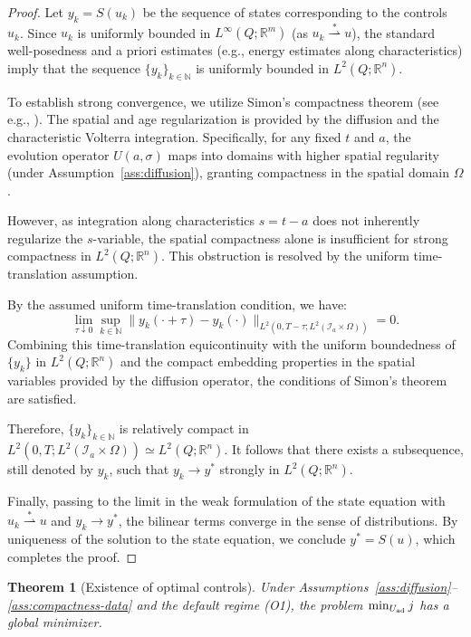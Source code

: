\documentclass[pdflatex,sn-mathphys-num]{sn-jnl}
\theoremstyle{plain}
\newtheorem{theorem}{Theorem}[section]
\theoremstyle{definition}
\theoremstyle{remark}
\newcommand{\R}{\mathbb R}
\newcommand{\N}{\mathbb N}
\begin{document}
\begin{proof}
Let \(y_k = S(u_k)\) be the sequence of states corresponding to the controls \(u_k\). Since \(u_k\) is uniformly bounded in \(L^\infty(Q;\R^m)\) (as \(u_k \overset{*}{\rightharpoonup} u\)), the standard well-posedness and a priori estimates (e.g., energy estimates along characteristics) imply that the sequence \(\{y_k\}_{k\in\N}\) is uniformly bounded in \(L^2(Q;\R^n)\).

To establish strong convergence, we utilize Simon's compactness theorem (see e.g., \cite{simon1986compact}). The spatial and age regularization is provided by the diffusion and the characteristic Volterra integration. Specifically, for any fixed \(t\) and \(a\), the evolution operator \(U(a,\sigma)\) maps into domains with higher spatial regularity (under Assumption~\ref{ass:diffusion}), granting compactness in the spatial domain \(\Omega\). 

However, as integration along characteristics \(s=t-a\) does not inherently regularize the \(s\)-variable, the spatial compactness alone is insufficient for strong compactness in \(L^2(Q;\R^n)\). This obstruction is resolved by the uniform time-translation assumption.

By the assumed uniform time-translation condition, we have:
\[
\lim_{\tau\downarrow0} \sup_{k\in\N} \|y_k(\cdot+\tau) - y_k(\cdot)\|_{L^2(0,T-\tau;L^2(\mathcal I_a\times \Omega))} = 0.
\]
Combining this time-translation equicontinuity with the uniform boundedness of \(\{y_k\}\) in \(L^2(Q;\R^n)\) and the compact embedding properties in the spatial variables provided by the diffusion operator, the conditions of Simon's theorem are satisfied. 

Therefore, \(\{y_k\}_{k\in\N}\) is relatively compact in \(L^2(0,T; L^2(\mathcal I_a\times \Omega)) \simeq L^2(Q;\R^n)\). It follows that there exists a subsequence, still denoted by \(y_k\), such that \(y_k \to y^*\) strongly in \(L^2(Q;\R^n)\). 

Finally, passing to the limit in the weak formulation of the state equation with \(u_k \overset{*}{\rightharpoonup} u\) and \(y_k \to y^*\), the bilinear terms converge in the sense of distributions. By uniqueness of the solution to the state equation, we conclude \(y^* = S(u)\), which completes the proof.
\end{proof}

\begin{theorem}[Existence of optimal controls]
\label{thm:existence-localized-observations}
Under Assumptions~\ref{ass:diffusion}--\ref{ass:compactness-data} and the
default regime (O1), the problem $\min_{U_{\rm ad}}j$ has a global minimizer.
\end{theorem}
\end{document}
